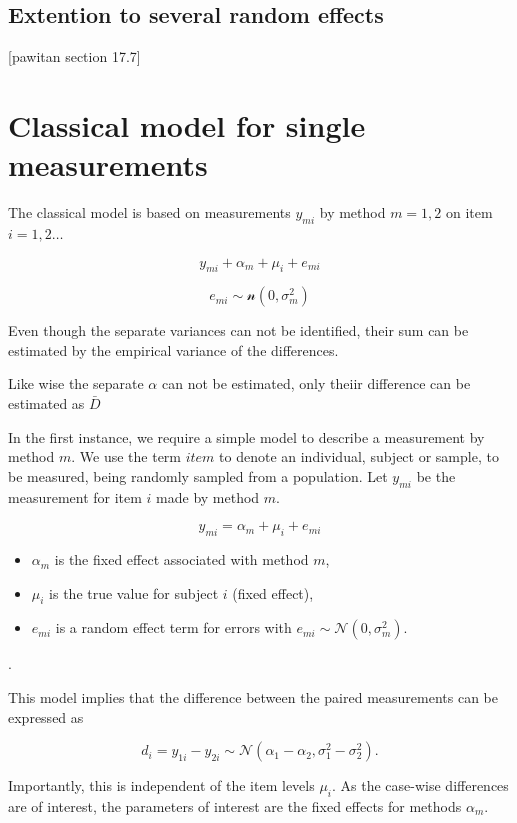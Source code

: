 \documentclass[12pt, a4paper]{report}
\theoremstyle{plain}
\theoremstyle{definition}
\theoremstyle{remark}
\begin{document}
	
	\subsection{Extention to several random effects}
	[pawitan section 17.7]
	
	
	
	
	
	
	\section{Classical model for single measurements}
	The classical model is based on measurements $y_{mi}$
	by method $m=1,2$ on item $i = 1,2 \ldots$
	
	\[y_{mi} + \alpha_{m} + \mu_{i} + e_{mi}\]
	
	\[e_{mi} \sim \mathcal{n} (0,\sigma^2_m)\]
	
	Even though the separate variances can not be
	identified, their sum can be estimated by the empirical variance of the differences.
	
	Like wise the separate $\alpha$ can not be
	estimated, only theiir difference can be estimated as
	$\bar{D}$
	
	
	In the first instance, we require a simple model to describe a measurement by method $m$. We use the term $item$ to denote an individual, subject or sample, to be measured, being randomly sampled from a population. Let $y_{mi}$ be the measurement for item $i$ made by method $m$.
	
	\[ y_{mi} = \alpha_{m} + \mu_{i} + e_{mi}  \]
	
	\begin{itemize}
		\item $\alpha_m$ is the fixed effect associated with method $m$,
		\item $\mu_i$ is the true value for subject $i$ (fixed effect),
		\item $e_{mi}$ is a
		random effect term for errors with $e_{mi}  \sim \mathcal{N}(0,\sigma^2_m)$. \end{itemize}.
	
	This model implies that the difference between the paired measurements can be expressed as
	
	\[ d_{i} = y_{1i} - y_{2i} \sim \mathcal{N} (\alpha_{1} - \alpha_{2}, \sigma^2_{1} - \sigma^2_{2}). \]
	
	Importantly, this is independent of the item levels $\mu_i$. As the case-wise differences are of interest, the parameters of interest are the fixed effects for methods $\alpha_{m}$.
	
\end{document}
